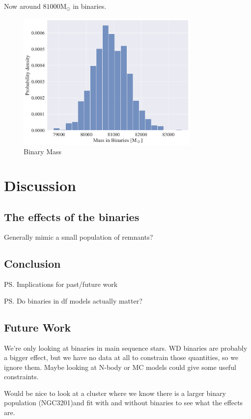 Now around $81000 \mathrm{M}_\odot$ in binaries.

\begin{figure}
	\centering
	\includegraphics[width=0.8\textwidth]{figures/high_bin_model/binary_mass.png}
	\caption{Binary Mass}
	\label{fig:high_bin_model_Bin_mass}
\end{figure}





\section{Discussion}

\subsection{The effects of the binaries}

Generally mimic a small population of remnants?









\subsection{Conclusion}

\ps{Implications for past/future work}

\ps{Do binaries in df models actually matter?}








\subsection{Future Work}

We're only looking at binaries in main sequence stars. WD binaries are probably a bigger effect, but
we have no data at all to constrain those quantities, so we ignore them. Maybe looking at N-body or
MC models could give some useful constraints.

Would be nice to look at a cluster where we know there is a larger binary population (NGC3201)and
fit with and without binaries to see what the effects are.